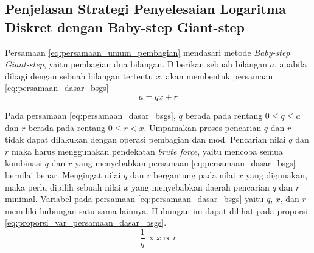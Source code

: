 \subsection {Penjelasan Strategi Penyelesaian Logaritma Diskret dengan Baby-step Giant-step}

Persamaan \eqref{eq:persamaan_umum_pembagian} mendasari metode \textit{Baby-step Giant-step}, yaitu pembagian dua bilangan. Diberikan sebuah bilangan $ a $, apabila dibagi dengan sebuah bilangan tertentu $ x $, akan membentuk persamaan \eqref{eq:persamaan_dasar_bsgs}
\begin{equation}
a=qx+r
\label{eq:persamaan_dasar_bsgs}
\end{equation}

Pada persamaan \eqref{eq:persamaan_dasar_bsgs}, $ q $ berada pada rentang $ 0 \leq q \leq a $ dan $ r $ berada pada rentang 
$ 0 \leq r < x $. Umpamakan proses pencarian $ q $ dan $ r $ tidak dapat dilakukan dengan operasi pembagian dan mod. Pencarian nilai $ q $ dan $ r $ maka harus menggunakan pendekatan \textit{brute force}, yaitu mencoba semua kombinasi $ q $ dan $ r $ yang menyebabkan persamaan \eqref{eq:persamaan_dasar_bsgs} bernilai benar. Mengingat nilai $ q $ dan $ r $ bergantung pada nilai $ x $ yang digunakan, maka perlu dipilih sebuah nilai $ x $ yang menyebabkan daerah pencarian $ q $ dan $ r $ minimal. Variabel pada persamaan \eqref{eq:persamaan_dasar_bsgs} yaitu $ q $, $ x $, dan $ r $ memiliki hubungan satu sama lainnya. Hubungan ini dapat dilihat pada proporsi \eqref{eq:proporsi_var_persamaan_dasar_bsgs}.
\begin{equation}
\frac{1}{q} \propto x \propto r
\label{eq:proporsi_var_persamaan_dasar_bsgs}
\end{equation}

